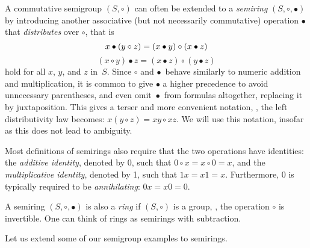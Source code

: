 \documentclass{toc}
\begin{document}
A commutative semigroup $(S, \circ)$ can often be extended to a \emph{semiring}
$(S, \circ, \bullet)$ by introducing another associative (but not necessarily
commutative) operation $\bullet$ that \emph{distributes} over $\circ$, that is
\[
x \bullet (y \circ z) = (x \bullet y) \circ (x \bullet z)\\
\]
\[
(x \circ y) \bullet z = (x \bullet z) \circ (y \bullet z)
\]
hold for all $x$, $y$, and $z$ in~$S$. Since $\circ$ and $\bullet$~behave
similarly to numeric addition and multiplication, it is common to give $\bullet$
a higher precedence to avoid unnecessary parentheses, and even omit~$\bullet$~from
formulas altogether, replacing it by juxtaposition. This gives a terser and
more convenient notation, \eg, the left distributivity law becomes:
$x (y \circ z) = x y \circ x z$. We will use this notation, insofar as this does
not lead to ambiguity.

Most definitions of semirings also require that the two operations have
identities: the \emph{additive identity}, denoted by 0, such that
$0 \circ x = x \circ 0=x$, and the \emph{multiplicative identity}, denoted by 1,
such that $1x=x1=x$. Furthermore, 0 is typically required to be
\emph{annihilating}: $0x=x0=0$.

A semiring $(S, \circ, \bullet)$ is also a \emph{ring} if $(S, \circ)$ is a
group, \ie, the operation $\circ$ is invertible. One can think of rings as
semirings with subtraction.

Let us extend some of our semigroup examples to
semirings. %
\end{document}
